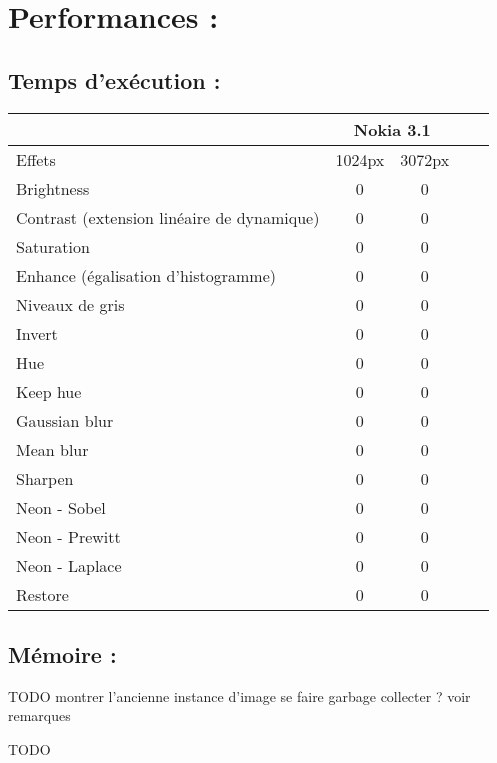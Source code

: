 \section{Performances :}

\subsection{Temps d'exécution :}

\begin{tabular}{||l||c|c||c|c||}
    \hline
    \hline
    & \multicolumn{2}{c||}{Nokia 3.1}\\
    \hline
    Effets & 1024px & 3072px\\
    \hline
    \hline
    Brightness & 0 & 0  \\
    \hline
    Contrast (extension linéaire de dynamique) & 0 & 0  \\
    \hline
    Saturation & 0 & 0  \\
    \hline
    Enhance (égalisation d'histogramme) & 0 & 0 \\
    \hline
    Niveaux de gris & 0 & 0 \\
    \hline
    Invert & 0 & 0  \\
    \hline
    Hue & 0 & 0 \\
    \hline
    Keep hue & 0 & 0 \\
    \hline
    Gaussian blur & 0 & 0\\
    \hline
    Mean blur & 0 & 0\\
    \hline
    Sharpen & 0 & 0\\
    \hline
    Neon - Sobel & 0 & 0\\
    \hline
    Neon - Prewitt & 0 & 0\\
    \hline
    Neon - Laplace & 0 & 0\\
    \hline
    Restore & 0 & 0\\
    \hline
    \hline
  \end{tabular}

\subsection{Mémoire :}
TODO montrer l'ancienne instance d'image se faire garbage collecter ? voir remarques

TODO